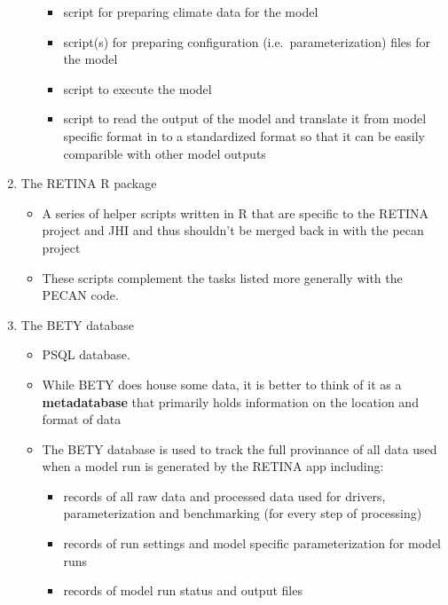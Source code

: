 \documentclass[
]{article}
\providecommand{\tightlist}{%
  \setlength{\itemsep}{0pt}\setlength{\parskip}{0pt}}
\begin{document}
\begin{enumerate}
\begin{itemize}
    \begin{itemize}
    \tightlist
    \item
      script for preparing climate data for the model
    \item
      script(s) for preparing configuration (i.e.~parameterization)
      files for the model
    \item
      script to execute the model
    \item
      script to read the output of the model and translate it from model
      specific format in to a standardized format so that it can be
      easily comparible with other model outputs
    \end{itemize}
  \end{itemize}
\item
  The RETINA R package

  \begin{itemize}
  \tightlist
  \item
    A series of helper scripts written in R that are specific to the
    RETINA project and JHI and thus shouldn't be merged back in with the
    pecan project
  \item
    These scripts complement the tasks listed more generally with the
    PECAN code.
  \end{itemize}
\item
  The BETY database

  \begin{itemize}
  \tightlist
  \item
    PSQL database.
  \item
    While BETY does house some data, it is better to think of it as a
    \textbf{metadatabase} that primarily holds information on the
    location and format of data
  \item
    The BETY database is used to track the full provinance of all data
    used when a model run is generated by the RETINA app including:

    \begin{itemize}
    \tightlist
    \item
      records of all raw data and processed data used for drivers,
      parameterization and benchmarking (for every step of processing)
    \item
      records of run settings and model specific parameterization for
      model runs
    \item
      records of model run status and output files
    \end{itemize}
  \end{itemize}
\end{enumerate}
\end{document}
